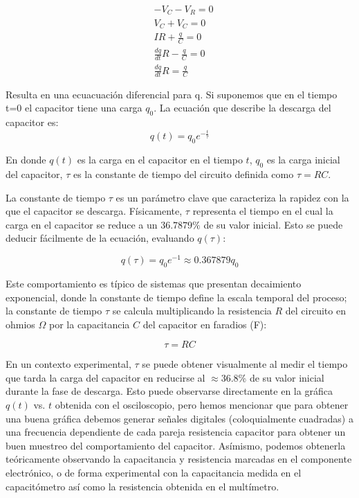\documentclass[article,12pt]{elsarticle}
\begin{document}
\begin{align*}
    &- V_C - V_R = 0   \\
    & V_C + V_C = 0  \\
    & IR + \frac{q}{C}  = 0\\
    & \frac{dq}{dt}R - \frac{q}{C} = 0 \\
    & \frac{dq}{dt}R = \frac{q}{C}\\
    & \\
\end{align*}
Resulta en una ecuacuación diferencial para q. Si suponemos que en el tiempo t=0 el capacitor tiene una carga $q_0$. La ecuación que describe la descarga del capacitor es:
\begin{equation}
q(t) = q_0 e^{-\frac{t}{\tau}}
\end{equation}

En donde \(q(t)\) es la carga en el capacitor en el tiempo \(t\), \(q_0\) es la carga inicial del capacitor, \(\tau\) es la constante de tiempo del circuito definida como \(\tau = RC\).

La constante de tiempo \(\tau\) es un parámetro clave que caracteriza la rapidez con la que el capacitor se descarga. Físicamente, \(\tau\) representa el tiempo en el cual la carga en el capacitor se reduce a un \(36.7879\%\) de su valor inicial. Esto se puede deducir fácilmente de la ecuación, evaluando \(q(\tau)\):

\begin{equation}
q(\tau) = q_0 e^{-1} \approx 0.367879 q_0
\end{equation}

Este comportamiento es típico de sistemas que presentan decaimiento exponencial, donde la constante de tiempo define la escala temporal del proceso; la constante de tiempo \(\tau\) 
se calcula multiplicando la resistencia \(R\) del circuito en ohmios \(\Omega\) por la capacitancia \(C\) del capacitor en faradios (F):

\begin{equation}
\tau = R C
\end{equation}

En un contexto experimental, \(\tau\) se puede obtener visualmente al medir el tiempo que tarda la carga del capacitor en reducirse al $\approx$36.8\% de su valor inicial durante la fase de descarga. Esto puede observarse directamente en la gráfica \(q(t)\) vs. \(t\) obtenida con el osciloscopio, pero hemos mencionar que para obtener una buena gráfica debemos generar señales digitales (coloquialmente cuadradas) a una frecuencia dependiente de cada pareja resistencia capacitor para obtener un buen muestreo del comportamiento del capacitor. Asímismo, podemos obtenerla teóricamente observando la capacitancia y resistencia marcadas en el componente electrónico, o de forma experimental con la capacitancia medida en el capacitómetro así como la resistencia obtenida en el multímetro.
\end{document}
